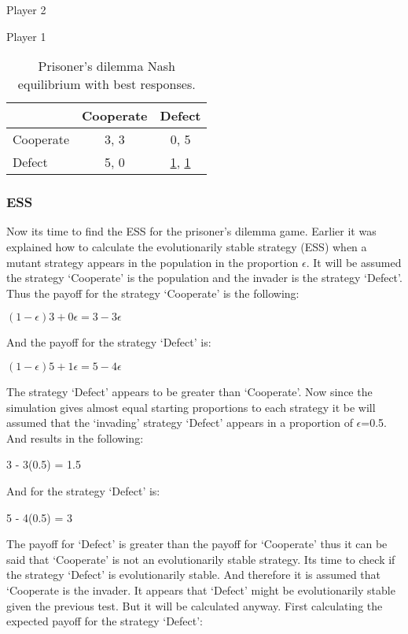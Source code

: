 \begin{table}[H]
\begin{center}
Player 2

Player 1
\begin{tabular}{|l|c|c|}
\hline
 & Cooperate & Defect\\ 
\hline
Cooperate & 3, 3 & 0, 5\\
\hline
Defect & 5, 0 & \underline{1}, \underline{1}\\
\hline
\end{tabular}

\caption{ Prisoner's dilemma Nash equilibrium with best responses.}
\label{fig:pdnashbr}	
\end{center}
\end{table}


\subsubsection{ESS}
Now its time to find the ESS for the prisoner's dilemma game. Earlier it was explained how to calculate the evolutionarily stable strategy (ESS) when a mutant strategy appears in the population in the proportion $\epsilon$. It will be assumed the strategy  `Cooperate' is the population and the invader is the strategy `Defect'. Thus the payoff for the strategy `Cooperate' is the following:
\begin{center}
$(1-{\epsilon})3 + 0{\epsilon} = 3 - 3{\epsilon}$
\end{center}
And the payoff for the strategy `Defect' is:
\begin{center}
$(1-{\epsilon})5 + 1{\epsilon} = 5 - 4{\epsilon}$
\end{center}
The strategy `Defect' appears to be greater than `Cooperate'. Now since the simulation gives almost equal starting proportions to each strategy it be will assumed that the `invading' strategy `Defect' appears in a proportion of $\epsilon$=0.5. And results in  the following:
\begin{center}
3 - 3(0.5) = 1.5
\end{center}
And for the strategy `Defect' is:
\begin{center}
 5 - 4(0.5) = 3
\end{center}
The payoff for `Defect' is greater than the payoff for `Cooperate' thus it can be said that `Cooperate' is not an evolutionarily stable strategy.
Its time to check if the strategy `Defect' is evolutionarily stable. And therefore it is assumed that `Cooperate is the invader. It  appears that `Defect' might be evolutionarily stable given the previous test. But it will be calculated anyway. First calculating the expected payoff for the strategy `Defect':

